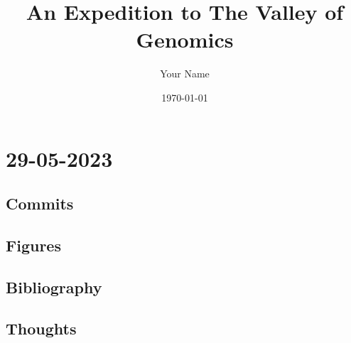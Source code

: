 \documentclass{article}
\begin{document}
\title{An Expedition to The Valley of Genomics}
\author{Your Name}
\date{\today}

\maketitle



\section{29-05-2023}
\subsection{Commits}
\subsection{Figures}
\subsection{Bibliography}
\subsection{Thoughts}
\end{document}
